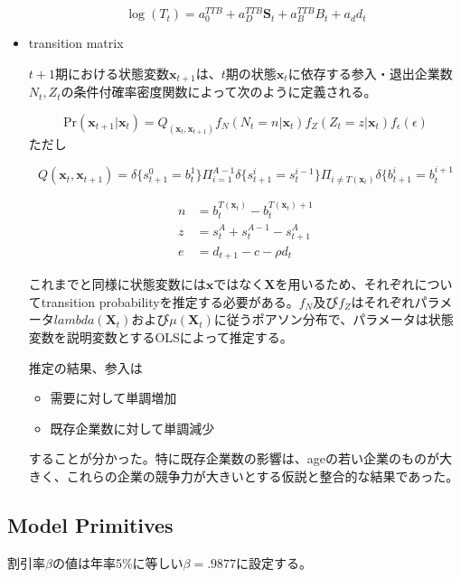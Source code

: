 \documentclass[11pt]{jsarticle}
\begin{document}
\begin{itemize}
  \[
  \log (T_t) = a_0^{TTB} + a_D^{TTB} \mathbf{S}_t + a_B^{TTB} B_t + a_d d_t
  \]

  \item transition matrix

  $t+1$期における状態変数$\mathbf{x}_{t+1}$は、$t$期の状態$\mathbf{x}_t$に依存する参入・退出企業数$N_t, Z_t$の条件付確率密度関数によって次のように定義される。

  \[
  \text{Pr}(\mathbf{x}_{t+1} | \mathbf{x}_t) = Q_(\mathbf{x}_t, \mathbf{x}_{t+1}) f_N (N_t = n | \mathbf{x}_t) f_Z(Z_t = z | \mathbf{x}_t)f_{\epsilon}(\epsilon)
  \]
  ただし

  \[
  Q(\mathbf{x}_t, \mathbf{x}_{t+1}) = \delta \{s_{t+1}^0 = b_t^1 \} \Pi_{i=1}^{A-1} \delta \{s_{t+1}^i = s_t^{i-1} \} \Pi_{i \neq T(\mathbf{x}_t)} \delta \{b_{t+1}^i = b_t^{i+1}
  \]

  \begin{align*}
    n &= b_t^{T(\mathbf{x}_t)} - b_t^{T(\mathbf{x}_t) +1} \\
    z &= s_t^A + s_t^{A-1} - s_{t+1}^A \\
    e &= d_{t+1} - c - \rho d_t
  \end{align*}

  これまでと同様に状態変数には$\mathbf{x}$ではなく$\mathbf{X}$を用いるため、それぞれについてtransition probabilityを推定する必要がある。$f_N$及び$f_Z$はそれぞれパラメータ$lambda(\mathbf{X}_t)$および$\mu(\mathbf{X}_t)$に従うポアソン分布で、パラメータは状態変数を説明変数とするOLSによって推定する。

  推定の結果、参入は

  \begin{itemize}
    \item 需要に対して単調増加

    \item 既存企業数に対して単調減少
  \end{itemize}

  することが分かった。特に既存企業数の影響は、ageの若い企業のものが大きく、これらの企業の競争力が大きいとする仮説と整合的な結果であった。
\end{itemize}


\subsection{Model Primitives}

割引率$\beta$の値は年率5\%に等しい$\beta = .9877$に設定する。
\end{document}
